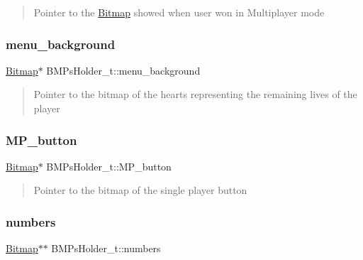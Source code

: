 \begin{quote}
Pointer to the \hyperlink{struct_bitmap}{Bitmap} showed when user won in Multiplayer mode \end{quote}


\hypertarget{struct_b_m_ps_holder__t_ac193d2d14607ee64994b4385d21808b3}{}\label{struct_b_m_ps_holder__t_ac193d2d14607ee64994b4385d21808b3} 
\subsubsection{\texorpdfstring{menu\+\_\+background}{menu\_background}}
{\footnotesize\ttfamily \hyperlink{struct_bitmap}{Bitmap}$\ast$ B\+M\+Ps\+Holder\+\_\+t\+::menu\+\_\+background}



\begin{quote}
Pointer to the bitmap of the hearts representing the remaining lives of the player \end{quote}


\hypertarget{struct_b_m_ps_holder__t_a4c46a999d7b9f15c2ecc0ad5b3b69163}{}\label{struct_b_m_ps_holder__t_a4c46a999d7b9f15c2ecc0ad5b3b69163} 
\subsubsection{\texorpdfstring{M\+P\+\_\+button}{MP\_button}}
{\footnotesize\ttfamily \hyperlink{struct_bitmap}{Bitmap}$\ast$ B\+M\+Ps\+Holder\+\_\+t\+::\+M\+P\+\_\+button}



\begin{quote}
Pointer to the bitmap of the single player button \end{quote}


\hypertarget{struct_b_m_ps_holder__t_abf522b5ab7fa5ca09282b2b6ce8efe2b}{}\label{struct_b_m_ps_holder__t_abf522b5ab7fa5ca09282b2b6ce8efe2b} 
\subsubsection{\texorpdfstring{numbers}{numbers}}
{\footnotesize\ttfamily \hyperlink{struct_bitmap}{Bitmap}$\ast$$\ast$ B\+M\+Ps\+Holder\+\_\+t\+::numbers}

